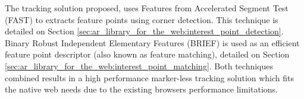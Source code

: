 The tracking solution proposed, uses Features from Accelerated Segment Test (FAST) \cite{Rosten2010} to extracts feature points using corner detection. This technique is detailed on Section \ref{sec:ar_library_for_the_web:interest_point_detection}. Binary Robust Independent Elementary Features (BRIEF) \cite{Calonder2010} is used as an efficient feature point descriptor (also known as feature matching), detailed on Section \ref{sec:ar_library_for_the_web:interest_point_matching}. Both techniques combined results in a high performance marker-less tracking solution which fits the native web needs due to the existing browsers performance limitations.



